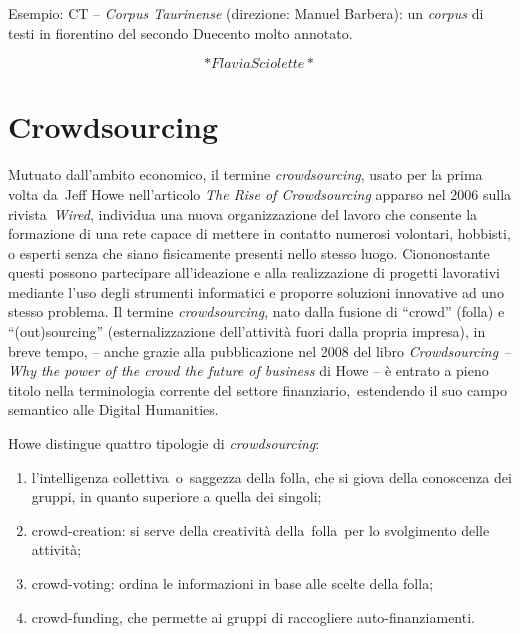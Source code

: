 \documentclass[
  b5paper,
  twoside,
  11pt,
  chapterprefix=false,
  bibliography=totocnumbered,
  listof=flat]{scrbook}
\begin{document}
Esempio: CT -- \emph{Corpus Taurinense} (direzione: Manuel Barbera): un
\emph{corpus} di testi in fiorentino del secondo Duecento molto annotato.

\[*Flavia Sciolette*\]

\hypertarget{crowdsourcing}{%
\chapter{Crowdsourcing}\label{crowdsourcing}}

Mutuato dall'ambito economico, il termine \emph{crowdsourcing}, usato per la
prima volta da~Jeff Howe nell'articolo \emph{The Rise of Crowdsourcing}
apparso nel 2006 sulla rivista~\emph{Wired}, individua una nuova
organizzazione del lavoro che consente la formazione di una rete capace
di mettere in contatto numerosi volontari, hobbisti, o esperti senza che
siano fisicamente presenti nello stesso luogo. Ciononostante questi
possono partecipare all'ideazione e alla realizzazione di progetti
lavorativi mediante l'uso degli strumenti informatici e proporre
soluzioni innovative ad uno stesso problema. Il termine \emph{crowdsourcing},
nato dalla fusione di \enquote{crowd} (folla) e \enquote{(out)sourcing}
(esternalizzazione dell'attività fuori dalla propria impresa), in breve
tempo, -- anche grazie alla pubblicazione nel 2008 del libro
\emph{Crowdsourcing -- Why the power of the crowd the future of business} di
Howe -- è entrato a pieno titolo nella terminologia corrente del settore
finanziario,~estendendo il suo campo semantico alle Digital Humanities.

Howe distingue quattro tipologie di \emph{crowdsourcing}:

\begin{enumerate}
\def\labelenumi{\arabic{enumi}.}
\item
  l'intelligenza collettiva~o~saggezza della folla, che si giova della
  conoscenza dei gruppi, in quanto superiore a quella dei singoli;
\item
  crowd-creation: si serve della creatività della~folla~per lo
  svolgimento delle attività;
\item
  crowd-voting: ordina le informazioni in base alle scelte della
  folla;
\item
  crowd-funding, che permette ai gruppi di raccogliere
  auto-finanziamenti.
\end{enumerate}
\end{document}
